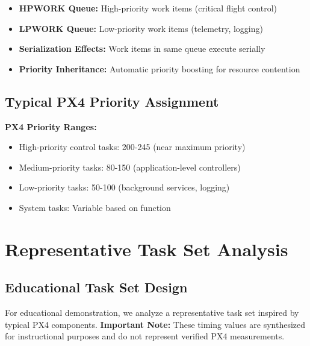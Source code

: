 \documentclass[12pt,a4paper]{article}
\begin{document}
\begin{itemize}
\item \textbf{HPWORK Queue:} High-priority work items (critical flight control)
\item \textbf{LPWORK Queue:} Low-priority work items (telemetry, logging)
\item \textbf{Serialization Effects:} Work items in same queue execute serially
\item \textbf{Priority Inheritance:} Automatic priority boosting for resource contention
\end{itemize}

\subsection{Typical PX4 Priority Assignment}

\textbf{PX4 Priority Ranges:}
\begin{itemize}
\item High-priority control tasks: 200-245 (near maximum priority)
\item Medium-priority tasks: 80-150 (application-level controllers)
\item Low-priority tasks: 50-100 (background services, logging)
\item System tasks: Variable based on function
\end{itemize}

\section{Representative Task Set Analysis}

\subsection{Educational Task Set Design}

For educational demonstration, we analyze a representative task set inspired by typical PX4 components. \textbf{Important Note:} These timing values are synthesized for instructional purposes and do not represent verified PX4 measurements.
\end{document}
